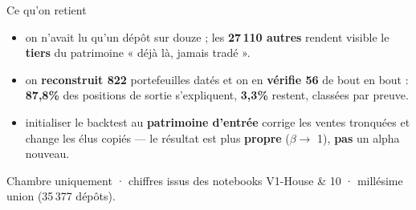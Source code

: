 \documentclass[11pt,aspectratio=169]{beamer}
\begin{document}
\begin{frame}{Ce qu'on retient}
  \vspace{2mm}
  \begin{itemize}\small
   \item[\textcolor{dataC}{\textbf{1}}] on n'avait lu qu'un dépôt sur douze ; les \textbf{27\,110 autres} rendent visible le \textbf{tiers} du patrimoine « déjà là, jamais tradé ».
   \item[\textcolor{helec}{\textbf{2}}] on \textbf{reconstruit 822} portefeuilles datés et on en \textbf{vérifie 56} de bout en bout : \textbf{87,8\%} des positions de sortie s'expliquent, \textbf{3,3\%} restent, classées par preuve.
   \item[\textcolor{okgreen}{\textbf{3}}] initialiser le backtest au \textbf{patrimoine d'entrée} corrige les ventes tronquées et change les élus copiés --- le résultat est plus \textbf{propre} ($\beta \to$ 1), \textbf{pas} un alpha nouveau.
  \end{itemize}
  \vspace{4mm}
  {\footnotesize\color{black!55} Chambre uniquement · chiffres issus des notebooks V1-House \& 10 · millésime union (35\,377 dépôts).}
  \label{endmain}
\end{frame}
\end{document}
